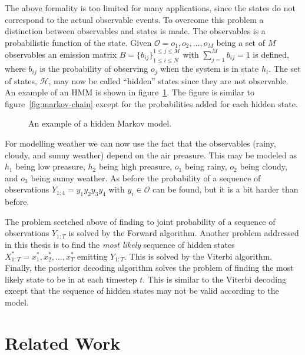 The above formality is too limited for many applications, since the states do
not correspond to the actual observable events. To overcome this problem a
distinction between observables and states is made. The observables is a
probabilistic function of the state. Given
$\mathcal{O} = {o_1, o_2, \dots, o_M}$ being a set of $M$ observables an
emission matrix $B = {\{b_{ij}\}}_{1 \le i \le N}^{1 \le j \le M}$ with
$\sum_{j=1}^M b_{ij} = 1$ is defined, where $b_{ij}$ is the probability of
observing $o_j$ when the system is in state $h_i$. The set of states,
$\mathcal{H}$, may now be called ``hidden'' states since they are not
observable. An example of an HMM is shown in
figure~\ref{fig:hidden-markov-model}. The figure is similar to
figure~\ref{fig:markov-chain} except for the probabilities added for each
hidden state.

\begin{figure}
  \centering
  
  \caption{An example of a hidden Markov model.}
  \label{fig:hidden-markov-model}
\end{figure}

For modelling weather we can now use the fact that the observables (rainy,
cloudy, and sunny weather) depend on the air preasure. This may be modeled as
$h_1$ being low preasure, $h_2$ being high preasure, $o_1$ being rainy, $o_2$
being cloudy, and $o_3$ being sunny weather. As before the probability of a
sequence of observations $Y_{1:4} = y_1y_2y_3y_4$ with $y_i \in \mathcal{O}$
can be found, but it is a bit harder than before.

The problem scetched above of finding to joint probability of a sequence of
observations $Y_{1:T}$ is solved by the Forward algorithm. Another problem
addressed in this thesis is to find the \emph{most likely} sequence of hidden
states $X_{1:T}^* = x_1^*, x_2^*, \dots, x_T^*$ emitting $Y_{1:T}$. This is
solved by the Viterbi algorithm. Finally, the posterior decoding algorithm
solves the problem of finding the most likely state to be in at each timestep
$t$. This is similar to the Viterbi decoding except that the sequence of hidden
states may not be valid according to the model.

\section{Related Work}

